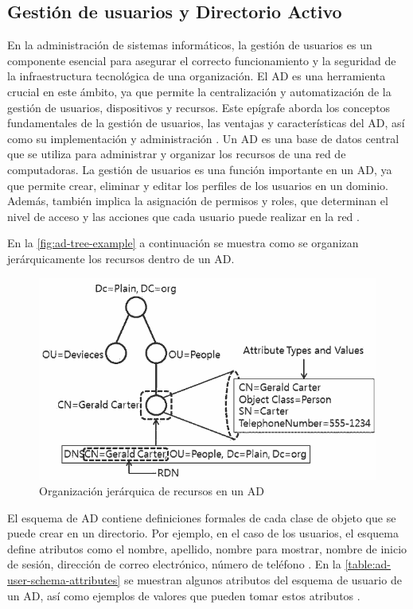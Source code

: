 \subsection{Gestión de usuarios y Directorio Activo}

En la administración de sistemas informáticos, la gestión de usuarios es un componente esencial para asegurar el correcto funcionamiento y la seguridad de la infraestructura tecnológica de una organización. El AD es una herramienta crucial en este ámbito, ya que permite la centralización y automatización de la gestión de usuarios, dispositivos y recursos. Este epígrafe aborda los conceptos fundamentales de la gestión de usuarios, las ventajas y características del AD, así como su implementación y administración \autocite{thakur_user_2015-1,josang_local_2015}.
Un AD es una base de datos central que se utiliza para administrar y organizar los recursos de una red de computadoras. La gestión de usuarios es una función importante en un AD, ya que permite crear, eliminar y editar los perfiles de los usuarios en un dominio. Además, también implica la asignación de permisos y roles, que determinan el nivel de acceso y las acciones que cada usuario puede realizar en la red \autocite{bartlett_samba_2005,dansimp_active_2023,imanudin_active_2019}.

En la \autoref{fig:ad-tree-example} a continuación se muestra como se organizan jerárquicamente los recursos dentro de un AD.

\begin{figure}[h]
    \centering
    \includegraphics[width=\linewidth]{images/ad-tree-2.png}
    \caption{Organización jerárquica de recursos en un AD}
    \label{fig:ad-tree-example}
\end{figure}

El esquema de AD contiene definiciones formales de cada clase de objeto que se puede crear en un directorio. Por ejemplo, en el caso de los usuarios, el esquema define atributos como el nombre, apellido, nombre para mostrar, nombre de inicio de sesión, dirección de correo electrónico, número de teléfono \autocite{harrison_lightweight_2006,voglmaier_abcs_2003,howes_ldap_1997}. En la \autoref{table:ad-user-schema-attributes} se muestran algunos atributos del esquema de usuario de un AD, así como ejemplos de valores que pueden tomar estos atributos \autocite{derdus_user_2024}.


